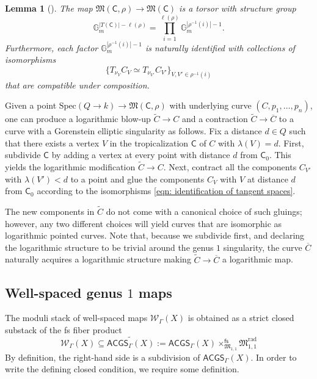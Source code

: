\documentclass{article}
\def\WG{\mathcal{W}_{\Gamma}}
\newtheorem{lemma}[definition]{Lemma}
\newcommand{\rad}{\mathrm{rad}}
\begin{document}
\begin{lemma}[{\cite[Lemma 3.2]{KS}}]
The map 
$
\mathfrak{M}(\mathsf{C},\rho) \to \mathfrak{M}(\mathsf{C})
$
is a torsor with structure group
\[
\mathbb{G}_m^{|T(\mathsf{C})|-\ell(\rho)}
=
\prod_{i=1}^{\ell(\rho)} \mathbb{G}_m^{|\rho^{-1}(i)|-1}.
\]
Furthermore, each factor $\mathbb{G}_m^{|\rho^{-1}(i)|-1}$ is naturally identified with collections of isomorphisms
\begin{equation}\label{eqn: identification of tangent spaces}
\{ T_{\nu_V}C_V \simeq T_{\nu_{V'}}C_{V'} \}_{V,V' \in \rho^{-1}(i)}
\end{equation}
that are compatible under composition.
\end{lemma}



Given a point $\mathrm{Spec}(Q \to k) \to \mathfrak{M}(\mathsf{C},\rho)$ with underlying curve $(C,p_1,\ldots,p_n)$, one can produce a logarithmic blow-up $\widetilde{C} \to C$ and a contraction $\widetilde{C} \to \overline{C}$ to a curve with a Gorenstein elliptic singularity as follows.
Fix a distance $d \in Q$ such that there exists a vertex $V$ in the tropicalization $\mathsf{C}$ of $C$ with $\lambda(V)=d$. First, subdivide $\mathsf{C}$ by adding a vertex at every point with distance $d $ from $\mathsf{C}_0$. This yields the logarithmic modification $\widetilde{C} \to C$. Next, contract all the components $C_{V'}$ with $\lambda(V') < d $ to a point and glue the components $C_V$ with $V$ at distance $d$ from $\mathsf{C}_0$ according to the isomorphisms \eqref{eqn: identification of tangent spaces}.

The new components in $\widetilde{C}$ do not come with a canonical choice of such gluings; however, any two different choices will yield curves that are isomorphic as logarithmic pointed curves. 
Note that, because we subdivide first, and declaring the logarithmic structure to be trivial around the genus $1$ singularity, the curve $\overline{C}$ naturally acquires a logarithmic structure making $\widetilde{C} \to \overline{C}$ a logarithmic map.








\subsection{Well-spaced genus $1$ maps}

The moduli stack of well-spaced maps $\WG(X)$ is obtained as a strict closed substack of the fs fiber product
\begin{equation}\label{eqn: inclusion WG(X) in ACGS}
\WG(X) \subseteq \widetilde{\mathsf{ACGS}_{\Gamma}(X)}:=\mathsf{ACGS}_{\Gamma}(X) \times_{\mathfrak{M}_{1,1}}^{\mathsf{fs}} \mathfrak{M}_{1,1}^{\rad}
\end{equation}
By definition, the right-hand side is a subdivision of $\mathsf{ACGS}_{\Gamma}(X)$. In order to write the defining closed condition, we require some definition.
\end{document}
